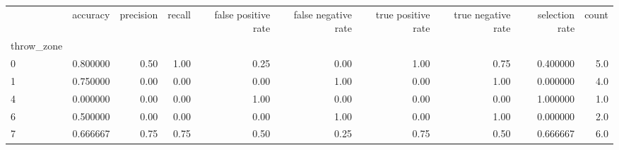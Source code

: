 \begin{tabular}{lrrrrrrrrr}
\toprule
{} &  accuracy &  precision &  recall &  false positive rate &  false negative rate &  true positive rate &  true negative rate &  selection rate &  count \\
throw\_zone &           &            &         &                      &                      &                     &                     &                 &        \\
\midrule
0          &  0.800000 &       0.50 &    1.00 &                 0.25 &                 0.00 &                1.00 &                0.75 &        0.400000 &    5.0 \\
1          &  0.750000 &       0.00 &    0.00 &                 0.00 &                 1.00 &                0.00 &                1.00 &        0.000000 &    4.0 \\
4          &  0.000000 &       0.00 &    0.00 &                 1.00 &                 0.00 &                0.00 &                0.00 &        1.000000 &    1.0 \\
6          &  0.500000 &       0.00 &    0.00 &                 0.00 &                 1.00 &                0.00 &                1.00 &        0.000000 &    2.0 \\
7          &  0.666667 &       0.75 &    0.75 &                 0.50 &                 0.25 &                0.75 &                0.50 &        0.666667 &    6.0 \\
\bottomrule
\end{tabular}
